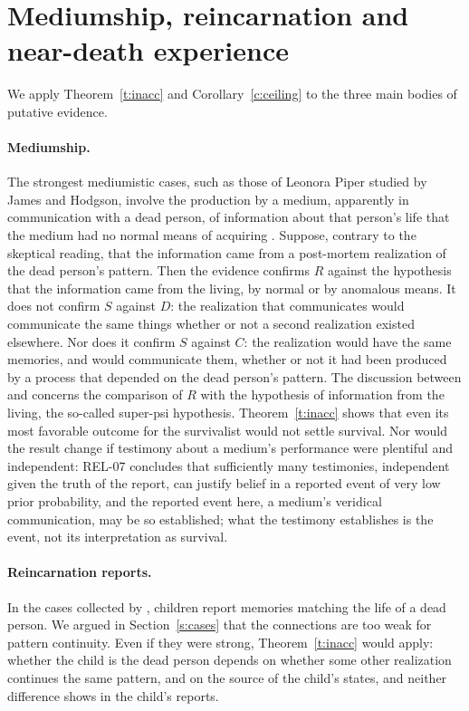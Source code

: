 \documentclass{situationist-preprint}
\begin{document}
\section{Mediumship, reincarnation and near-death experience}\label{s:evcases}

We apply Theorem~\ref{t:inacc} and Corollary~\ref{c:ceiling} to the three main bodies of putative evidence.

\paragraph{Mediumship.} The strongest mediumistic cases, such as those of Leonora Piper studied by James and Hodgson, involve the production by a medium, apparently in communication with a dead person, of information about that person's life that the medium had no normal means of acquiring \citep{Gauld1982}. Suppose, contrary to the skeptical reading, that the information came from a post-mortem realization of the dead person's pattern. Then the evidence confirms $R$ against the hypothesis that the information came from the living, by normal or by anomalous means. It does not confirm $S$ against $D$: the realization that communicates would communicate the same things whether or not a second realization existed elsewhere. Nor does it confirm $S$ against $C$: the realization would have the same memories, and would communicate them, whether or not it had been produced by a process that depended on the dead person's pattern. The discussion between \citet{Almeder1992} and \citet{Braude2003} concerns the comparison of $R$ with the hypothesis of information from the living, the so-called super-psi hypothesis. Theorem~\ref{t:inacc} shows that even its most favorable outcome for the survivalist would not settle survival. Nor would the result change if testimony about a medium's performance were plentiful and independent: REL-07 concludes that sufficiently many testimonies, independent given the truth of the report, can justify belief in a reported event of very low prior probability, and the reported event here, a medium's veridical communication, may be so established; what the testimony establishes is the event, not its interpretation as survival.

\paragraph{Reincarnation reports.} In the cases collected by \citet{Stevenson1974}, children report memories matching the life of a dead person. We argued in Section~\ref{s:cases} that the connections are too weak for pattern continuity. Even if they were strong, Theorem~\ref{t:inacc} would apply: whether the child is the dead person depends on whether some other realization continues the same pattern, and on the source of the child's states, and neither difference shows in the child's reports.
\end{document}
